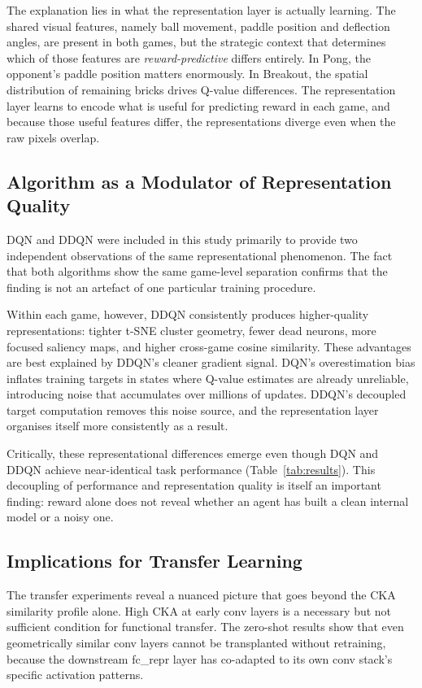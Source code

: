 \documentclass[a4paper]{article}
\begin{document}
The explanation lies in what the representation layer is actually learning. The shared visual features, namely ball movement, paddle position and deflection angles, are present in both games, but the strategic context that determines which of those features are \textit{reward-predictive} differs entirely. In Pong, the opponent's paddle position matters enormously. In Breakout, the spatial distribution of remaining bricks drives Q-value differences. The representation layer learns to encode what is useful for predicting reward in each game, and because those useful features differ, the representations diverge even when the raw pixels overlap.

\subsection{Algorithm as a Modulator of Representation Quality}

DQN and DDQN were included in this study primarily to provide two independent observations of the same representational phenomenon. The fact that both algorithms show the same game-level separation confirms that the finding is not an artefact of one particular training procedure.

Within each game, however, DDQN consistently produces higher-quality representations: tighter t-SNE cluster geometry, fewer dead neurons, more focused saliency maps, and higher cross-game cosine similarity. These advantages are best explained by DDQN's cleaner gradient signal. DQN's overestimation bias inflates training targets in states where Q-value estimates are already unreliable, introducing noise that accumulates over millions of updates. DDQN's decoupled target computation removes this noise source, and the representation layer organises itself more consistently as a result.

Critically, these representational differences emerge even though DQN and DDQN achieve near-identical task performance (Table~\ref{tab:results}). This decoupling of performance and representation quality is itself an important finding: reward alone does not reveal whether an agent has built a clean internal model or a noisy one.

\subsection{Implications for Transfer Learning}

The transfer experiments reveal a nuanced picture that goes beyond the CKA similarity profile alone. High CKA at early conv layers is a necessary but not sufficient condition for functional transfer. The zero-shot results show that even geometrically similar conv layers cannot be transplanted without retraining, because the downstream fc\_repr layer has co-adapted to its own conv stack's specific activation patterns.
\end{document}
